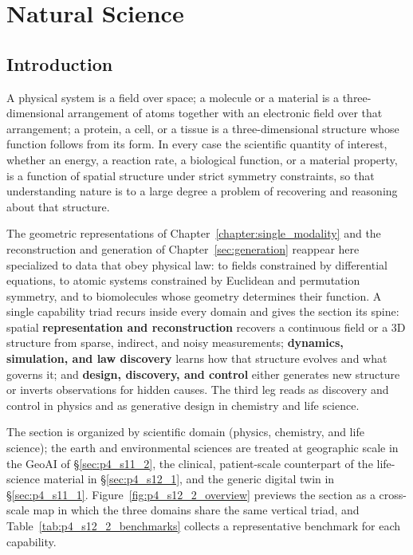 \section{Natural Science}
\label{sec:Natural Science}
\label{sec:p4_s12_2}


\subsection{Introduction}
\label{subsec:p4-sec12-2-introduction}

A physical system is a field over space; a molecule or a material is a three-dimensional arrangement of atoms together with an electronic field over that arrangement; a protein, a cell, or a tissue is a three-dimensional structure whose function follows from its form.
In every case the scientific quantity of interest, whether an energy, a reaction rate, a biological function, or a material property, is a function of spatial structure under strict symmetry constraints, so that understanding nature is to a large degree a problem of recovering and reasoning about that structure.

The geometric representations of Chapter~\ref{chapter:single_modality} and the reconstruction and generation of Chapter~\ref{sec:generation} reappear here specialized to data that obey physical law: to fields constrained by differential equations, to atomic systems constrained by Euclidean and permutation symmetry, and to biomolecules whose geometry determines their function.
A single capability triad recurs inside every domain and gives the section its spine: spatial \textbf{representation and reconstruction} recovers a continuous field or a 3D structure from sparse, indirect, and noisy measurements; \textbf{dynamics, simulation, and law discovery} learns how that structure evolves and what governs it; and \textbf{design, discovery, and control} either generates new structure or inverts observations for hidden causes. The third leg reads as discovery and control in physics and as generative design in chemistry and life science.

The section is organized by scientific domain (physics, chemistry, and life science); the earth and environmental sciences are treated at geographic scale in the GeoAI of §\ref{sec:p4_s11_2}, the clinical, patient-scale counterpart of the life-science material in §\ref{sec:p4_s12_1}, and the generic digital twin in §\ref{sec:p4_s11_1}.
Figure~\ref{fig:p4_s12_2_overview} previews the section as a cross-scale map in which the three domains share the same vertical triad, and Table~\ref{tab:p4_s12_2_benchmarks} collects a representative benchmark for each capability.


